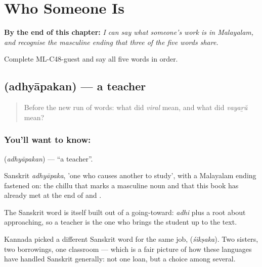 
\chapter{Who Someone Is}
\label{ch:ml-roles}

\begin{chapteropening}
\textbf{By the end of this chapter:} \emph{I can say what someone's work is in Malayalam, and recognise the masculine ending that three of the five words share.}

Complete ML-C48-guest and say all five words in order.
\end{chapteropening}

\section[\texorpdfstring{\ml{അധ്യാപകൻ} (adhyāpakan)}{അധ്യാപകൻ (adhyāpakan)}]{ (adhyāpakan) — a teacher}

\label{lesson:ML-C48-teacher}



\begin{quote}
Before the new run of words: what did \emph{viral} mean, and what did \emph{vayaṟŭ} mean?
\end{quote}

\subsection*{You'll want to know: }
\textbf{} (\emph{adhyāpakan}) — \textquotedblleft{}a teacher\textquotedblright{}.

Sanskrit \emph{adhyāpaka}, 'one who causes another to study', with a Malayalam ending fastened on: the chillu  that marks a masculine noun and that this book has already met at the end of  and .

The Sanskrit word is itself built out of a going-toward: \emph{adhi} plus a root about approaching, so a teacher is the one who brings the student up to the text.

Kannada picked a different Sanskrit word for the same job,  (\emph{śikṣaka}). Two sisters, two borrowings, one classroom — which is a fair picture of how these languages have handled Sanskrit generally: not one loan, but a choice among several.

